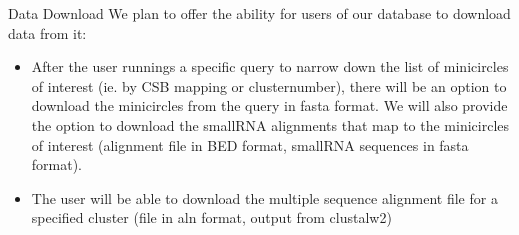 \documentclass[a4paper,10pt,notitlepage]{article}
\begin{document}
\begin{section}{Data Download}
    We plan to offer the ability for users of our database to download data from it:

    \begin{itemize}
        \item After the user runnings a specific query to narrow down the list of minicircles of interest (ie. by CSB mapping or 
            clusternumber), there will be an option to download the minicircles from the query in fasta format. We will also 
            provide the option to download the smallRNA alignments that map to the minicircles of interest (alignment file in 
            BED format, smallRNA sequences in fasta format). 
        \item The user will be able to download the multiple sequence alignment file for a specified cluster (file in aln 
            format, output from clustalw2)
    \end{itemize}

\end{section}



    



        
            
\end{document}
